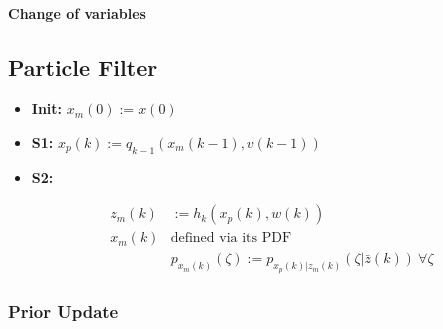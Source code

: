 \documentclass[10pt,a4paper]{scrartcl}
\begin{document}
\begin{multicols*}{2}
\begin{multicols*}{3}


\paragraph{Change of variables}



\subsection{Particle Filter}

\begin{itemize}
\item \textbf{Init:} $x_m(0):=x(0)$
\item \textbf{S1:} $x_p(k):=q_{k-1}(x_m(k-1),v(k-1))$
\item \textbf{S2:}

\begin{align*}
z_m(k)&:=h_k(x_p(k),w(k))\\
x_m(k)&\text{defined via its PDF}\\
&p_{x_m(k)}(\zeta):=p_{x_p(k)|z_m(k)}(\zeta|\bar{z}(k))\ \forall\zeta
\end{align*}
\end{itemize}

\subsubsection{Prior Update}



\end{multicols*}
\end{multicols*}
\end{document}
